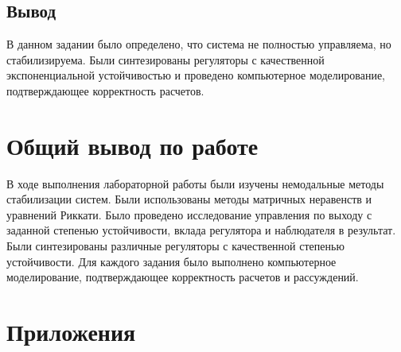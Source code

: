 \documentclass[a4paper, 12pt]{article}
\begin{document}
    \subsection{Вывод}
    В данном задании было определено, что система не полностью управляема, но стабилизируема.
    Были синтезированы регуляторы с качественной экспоненциальной устойчивостью и проведено
    компьютерное моделирование, подтверждающее корректность расчетов.


    \section{Общий вывод по работе}
    В ходе выполнения лабораторной работы были изучены немодальные методы стабилизации систем.
    Были использованы методы матричных неравенств и уравнений Риккати.
    Было проведено исследование управления по выходу с заданной степенью устойчивости, вклада
    регулятора и наблюдателя в результат.
    Были синтезированы различные регуляторы с качественной степенью устойчивости.
    Для каждого задания было выполнено компьютерное моделирование, подтверждающее корректность расчетов и рассуждений.


    \section{Приложения}
\end{document}
